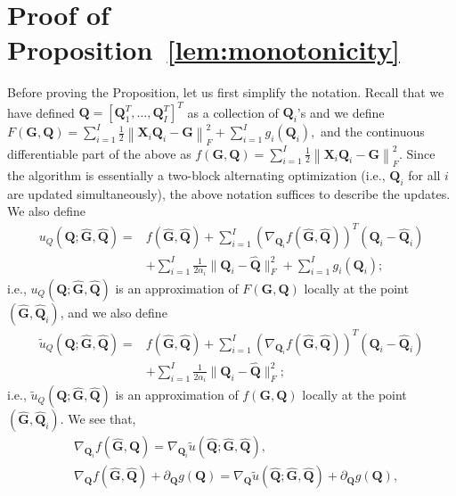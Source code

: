 \documentclass[10pt,journal]{IEEEtran}
\newcommand{\Q}{\boldsymbol{Q}}
\begin{document}
\section{Proof of Proposition~\ref{lem:monotonicity}}
Before proving the Proposition, let us first simplify the notation. Recall that we have defined ${\bm Q}=[{\bm Q}_1^T,\ldots,{\bm Q}_I^T]^T$ as a collection 
of $\Q_i$'s
and we define
$F({\bm G},{\bm Q}) = \sum_{i=1}^{I}\frac{1}{2}\left\|{\bm X}_i{\bm Q}_i-{\bm G}\right\|_F^2 + \sum_{i=1}^Ig_i(\Q_i),$
and the continuous differentiable part of the above as
$f({\bm G},{\bm Q}) = \sum_{i=1}^{I}\frac{1}{2}\left\|{\bm X}_i{\bm Q}_i-{\bm G}\right\|_F^2.$
Since the algorithm is essentially a two-block alternating optimization (i.e., ${\bm Q}_i$ for all $i$ are updated simultaneously), the above notation suffices to describe the updates.
We also define
\begin{align*}
u_Q\left(\Q;\hat{\bm G},\hat{\bm Q}\right) = &f(\hat{\bm G},\hat{\bm Q}) + \sum_{i=1}^I (\nabla_{{\bm Q}_i} f(\hat{\bm G},\hat{\bm Q}))^T({\bm Q}_i-\hat{\bm Q}_i)\\
&+ \sum_{i=1}^I\frac{1}{2\alpha_i}\|{\bm Q}_i-\hat{\bm Q}\|_F^2+ \sum_{i=1}^Ig_i(\Q_i);
\end{align*}
i.e., $u_Q\left({\bm Q};\hat{\bm G},\hat{\bm Q}\right)$ is an approximation of $F({\bm G},{\bm Q})$
locally at the point $(\hat{\bm G},\hat{\bm Q}_i)$, and
we also define
\begin{equation*}
\begin{aligned}
\tilde{u}_Q\left(\Q;\hat{\bm G},\hat{\bm Q}\right) = &f(\hat{\bm G},\hat{\bm Q})
+ \sum_{i=1}^I (\nabla_{{\bm Q}_i} f(\hat{\bm G},\hat{\bm Q}))^T({\bm Q}_i-\hat{\bm Q}_i)\\& + \sum_{i=1}^I\frac{1}{2\alpha_i}\|{\bm Q}_i-\hat{\bm Q}\|_F^2;
\end{aligned}
\end{equation*}
i.e., $\tilde{u}_Q\left(\Q;\hat{\bm G},\hat{\bm Q}\right)$ is an approximation of $f({\bm G},{\bm Q})$
locally at the point $(\hat{\bm G},\hat{\bm Q}_i)$.
We see that,
\begin{equation}\label{eq:gradequal}
\begin{aligned}
	&\nabla_{{\bm Q}_i} f\left(\hat{\bm G},\hat{\bm Q}\right)=\nabla_{{\bm Q}_i} \tilde{u}\left(\hat{\bm Q};\hat{\bm G},\hat{\bm Q}\right),\\
	& \nabla_{{\bm Q}} f\left(\hat{\bm G},\hat{\bm Q}\right) + \partial_{\Q} g(\Q) = \nabla_{{\bm Q}}\tilde{u}\left(\hat{\bm Q};\hat{\bm G},\hat{\bm Q}\right) + \partial_{\Q} g(\Q),
\end{aligned}
\end{equation}
\end{document}

